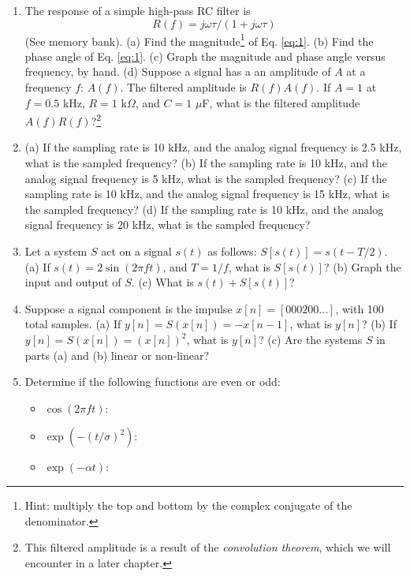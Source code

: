 \documentclass{article}
\begin{document}
\begin{enumerate}
\item The response of a simple high-pass RC filter is
\begin{equation}
R(f) = j\omega\tau/(1+j\omega \tau) \label{eq:1}
\end{equation}
(See memory bank).  (a) Find the magnitude\footnote{Hint: multiply the top and bottom by the complex conjugate of the denominator.} of Eq. \ref{eq:1}.  (b) Find the phase angle of Eq. \ref{eq:1}. (c) Graph the magnitude and phase angle versus frequency, by hand.  (d) Suppose a signal has a an amplitude of $A$ at a frequency $f$: $A(f)$.  The filtered amplitude is $R(f) A(f)$.  If $A=1$ at $f = 0.5$ kHz, $R = 1$ k$\Omega$, and $C = 1$ $\mu$F, what is the filtered amplitude $A(f) R(f)$?\footnote{This filtered amplitude is a result of the \textit{convolution theorem}, which we will encounter in a later chapter.} \\ \vspace{4cm}
\item (a) If the sampling rate is 10 kHz, and the analog signal frequency is 2.5 kHz, what is the sampled frequency? (b) If the sampling rate is 10 kHz, and the analog signal frequency is 5 kHz, what is the sampled frequency? (c) If the sampling rate is 10 kHz, and the analog signal frequency is 15 kHz, what is the sampled frequency? (d) If the sampling rate is 10 kHz, and the analog signal frequency is 20 kHz, what is the sampled frequency? \\ \vspace{2cm}
\item Let a system $S$ act on a signal $s(t)$ as follows: $S[s(t)] = s(t-T/2)$.  (a) If $s(t) = 2\sin(2\pi ft)$, and $T = 1/f$, what is $S[s(t)]$? (b) Graph the input and output of $S$. (c) What is $s(t) + S[s(t)]$? \\ \vspace{4cm}
\item Suppose a signal component is the impulse $x[n] = [000200 ...]$, with 100 total samples.  (a) If $y[n] = S(x[n]) = -x[n-1]$, what is $y[n]$? (b) If $y[n] = S(x[n]) = (x[n])^2$, what is $y[n]$?  (c) Are the systems $S$ in parts (a) and (b) linear or non-linear? \\ \vspace{2cm}
\item Determine if the following functions are even or odd:
\begin{itemize}
\item $\cos(2\pi ft)$:
\item $\exp(-(t/\sigma)^2)$:
\item $\exp(-\alpha t)$:

\end{itemize}
\end{enumerate}
\end{document}
